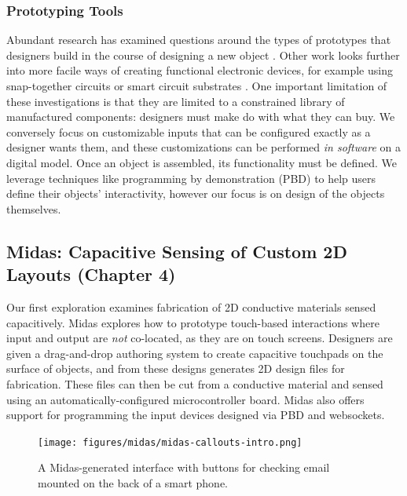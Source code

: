 \subsubsection{Prototyping Tools}
Abundant research has examined questions around the types of prototypes that designers build in the course of designing a new object \cite{houde-prototypes}. Other work looks further into more facile ways of creating functional electronic devices, for example using snap-together circuits \cite{littleBits, hartmann-dtools, villar-gadgeteer} or smart circuit substrates \cite{villar-voodooio}. One important limitation of these investigations is that they are limited to a constrained library of manufactured components: designers must make do with what they can buy. We conversely focus on customizable inputs that can be configured exactly as a designer wants them, and these customizations can be performed \emph{in software} on a digital model. Once an object is assembled, its functionality must be defined. We leverage techniques like programming by demonstration (PBD) \cite{myers-pbd, hartmann-dtools} to help users define their objects' interactivity, however our focus is on design of the objects themselves.


\subsection{Midas: Capacitive Sensing of Custom 2D Layouts (Chapter 4)}

Our first exploration examines fabrication of 2D conductive materials sensed capacitively. Midas explores how to prototype touch-based interactions where input and output are \emph{not} co-located, as they are on touch screens. Designers are given a drag-and-drop authoring system to create capacitive touchpads on the surface of objects, and from these designs generates 2D design files for fabrication. These files can then be cut from a conductive material and sensed using an automatically-configured microcontroller board. Midas also offers support for programming the input devices designed via PBD and websockets.

\begin{figure}
\centering
\texttt{[image: figures/midas/midas-callouts-intro.png]}
\caption{A Midas-generated interface with buttons for checking email mounted on the back of a smart phone.}
\label{fig:midas-intro}
\end{figure}

